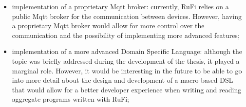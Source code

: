 \begin{itemize}
    \item implementation of a proprietary Mqtt broker: currently, RuFi relies on a public Mqtt broker for the communication between devices.
          However, having a proprietary Mqtt broker would allow for more control over the communication and the possibility of implementing more advanced features;
    \item implementation of a more advanced Domain Specific Language: although the topic was briefly addressed during the development of the thesis, it played a marginal role.
          However, it would be interesting in the future to be able to go into more detail about the design and development of a macro-based DSL that would allow for a better developer experience when writing and reading aggregate programs written with RuFi;
\end{itemize}